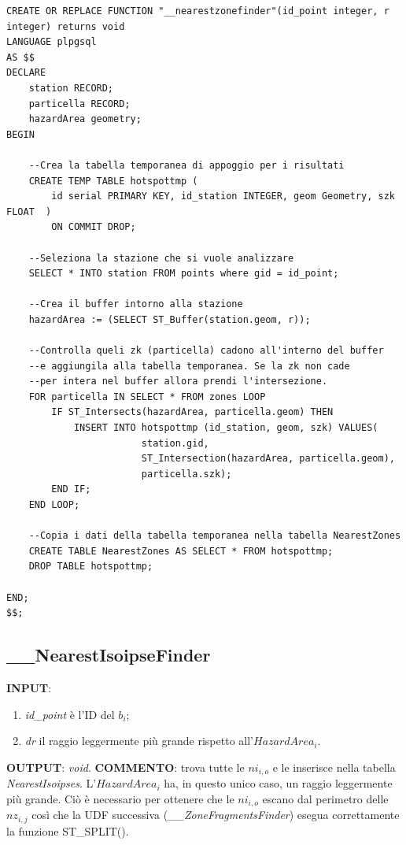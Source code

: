 \small
\begin{lstlisting}[style = mystyle]
CREATE OR REPLACE FUNCTION "__nearestzonefinder"(id_point integer, r integer) returns void
LANGUAGE plpgsql
AS $$
DECLARE
	station RECORD;
	particella RECORD;
	hazardArea geometry;
BEGIN
	
	--Crea la tabella temporanea di appoggio per i risultati
	CREATE TEMP TABLE hotspottmp ( 
		id serial PRIMARY KEY, id_station INTEGER, geom Geometry, szk FLOAT  ) 
		ON COMMIT DROP;
	
	--Seleziona la stazione che si vuole analizzare
	SELECT * INTO station FROM points where gid = id_point;
	
	--Crea il buffer intorno alla stazione
	hazardArea := (SELECT ST_Buffer(station.geom, r));
	
	--Controlla queli zk (particella) cadono all'interno del buffer 
	--e aggiungila alla tabella temporanea. Se la zk non cade 
	--per intera nel buffer allora prendi l'intersezione.
	FOR particella IN SELECT * FROM zones LOOP
		IF ST_Intersects(hazardArea, particella.geom) THEN
			INSERT INTO hotspottmp (id_station, geom, szk) VALUES(
						station.gid, 
						ST_Intersection(hazardArea, particella.geom),
						particella.szk);
		END IF;
	END LOOP;
	
	--Copia i dati della tabella temporanea nella tabella NearestZones
	CREATE TABLE NearestZones AS SELECT * FROM hotspottmp;
	DROP TABLE hotspottmp;

END;
$$;

\end{lstlisting}

\subsection{\_\_NearestIsoipseFinder}

\textbf{INPUT}: 
\begin{enumerate}
	\item \textit{id\_point} è l'ID del $b_i$;
	\item \textit{dr} il raggio leggermente più grande rispetto all'$HazardArea_i$.
\end{enumerate}
\textbf{OUTPUT}: \textit{void}. \newline
\textbf{COMMENTO}: trova tutte le $ni_{i,o}$ e le inserisce nella tabella \textit{NearestIsoipses}. L'$HazardArea_i$ ha, in questo unico caso, un raggio leggermente più grande. Ciò è necessario per ottenere che le $ni_{i,o}$ escano dal perimetro delle $nz_{i,j}$ così che la UDF successiva (\textit{\_\_ZoneFragmentsFinder}) esegua correttamente la funzione ST\_SPLIT(). 

